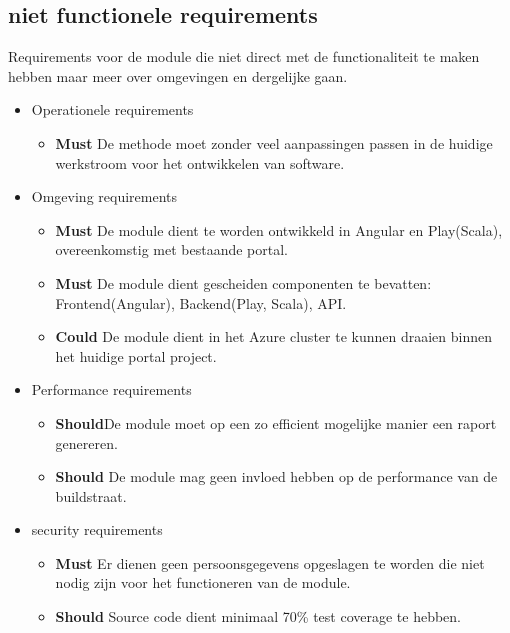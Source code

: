 \subsection{niet functionele requirements}\label{subsec:niet-functionele-requirements}
Requirements voor de module die niet direct met de functionaliteit te maken hebben maar meer over omgevingen en dergelijke gaan.
\begin{itemize}
    \item Operationele requirements
    \begin{itemize}
        \item \textbf{Must} De methode moet zonder veel aanpassingen passen in de huidige werkstroom voor het ontwikkelen van software.
    \end{itemize}
    \item Omgeving requirements
    \begin{itemize}
        \item \textbf{Must} De module dient te worden ontwikkeld in Angular en Play(Scala), overeenkomstig met bestaande portal.
        \item \textbf{Must} De module dient gescheiden componenten te bevatten: Frontend(Angular), Backend(Play, Scala), API\@.
        \item \textbf{Could} De module dient in het Azure cluster te kunnen draaien binnen het huidige portal project.
    \end{itemize}
    \item Performance requirements
    \begin{itemize}
        \item \textbf{Should}De module moet op een zo efficient mogelijke manier een raport genereren.
        \item \textbf{Should} De module mag geen invloed hebben op de performance van de buildstraat.
    \end{itemize}
    \item security requirements
    \begin{itemize}
        \item \textbf{Must} Er dienen geen persoonsgegevens opgeslagen te worden die niet nodig zijn voor het functioneren van de module.
        \item \textbf{Should} Source code dient minimaal 70\% test coverage te hebben.
    \end{itemize}
\end{itemize}

